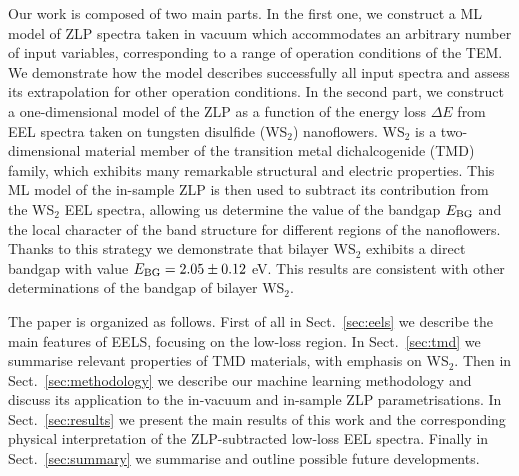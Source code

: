 Our work is composed of two main parts.
%
In the first one, we construct a ML model of ZLP spectra taken
in vacuum which accommodates an  arbitrary number of input
variables, corresponding to a range of operation conditions of the TEM.
%
We demonstrate how the model describes successfully all
input spectra and assess its extrapolation for other operation
conditions.
%
In the second part, we construct a one-dimensional model
of the ZLP as a function of the energy loss $\Delta E$ from EEL spectra taken on
tungsten disulfide (WS$_2$) nanoflowers.
%
WS$_2$ is a two-dimensional material member of the transition metal dichalcogenide (TMD) family,
which exhibits many remarkable structural and electric properties.
%
This ML model of the in-sample ZLP is then used to subtract its contribution
from the WS$_2$ EEL spectra, allowing us determine the value of the bandgap $E_{\rm BG}$
and the local character of the band structure for different regions of the nanoflowers.
%
Thanks to this strategy  we demonstrate that bilayer WS$_2$ exhibits a direct bandgap
with value $E_{\rm BG}= 2.05 \pm 0.12$ eV.
%
This results are consistent with other determinations of the bandgap of bilayer WS$_2$.

The paper is organized as follows.
%
First of all in Sect.~\ref{sec:eels}
we describe the main features of EELS, focusing on the low-loss region.
%
In Sect.~\ref{sec:tmd} we summarise relevant properties of TMD materials,
with emphasis on WS$_2$.
%
Then in Sect.~\ref{sec:methodology} we describe our machine learning methodology
and discuss its application to the in-vacuum and in-sample
ZLP parametrisations.
%
In Sect.~\ref{sec:results} we present the main results
of this work and the corresponding physical interpretation
of the ZLP-subtracted low-loss EEL spectra.
%
Finally in Sect.~\ref{sec:summary} we summarise
and outline possible future developments.
